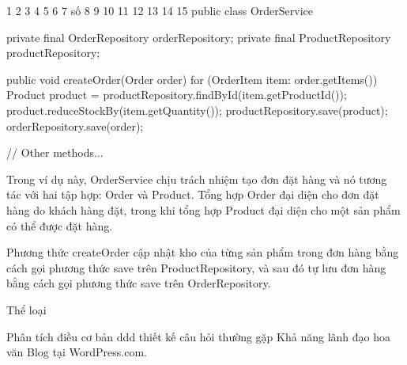 1
2
3
4
5
6
7
số 8
9
10
11
12
13
14
15
public class OrderService {
    private final OrderRepository orderRepository;
    private final ProductRepository productRepository;
 
    public void createOrder(Order order) {
        for (OrderItem item: order.getItems()) {
            Product product = productRepository.findById(item.getProductId());
            product.reduceStockBy(item.getQuantity());
            productRepository.save(product);
        }
        orderRepository.save(order);
    }
 
    // Other methods...
}
Trong ví dụ này, OrderService chịu trách nhiệm tạo đơn đặt hàng và nó tương tác với hai tập hợp: Order và Product. Tổng hợp Order đại diện cho đơn đặt hàng do khách hàng đặt, trong khi tổng hợp Product đại diện cho một sản phẩm có thể được đặt hàng.

Phương thức createOrder cập nhật kho của từng sản phẩm trong đơn hàng bằng cách gọi phương thức save trên ProductRepository, và sau đó tự lưu đơn hàng bằng cách gọi phương thức save trên OrderRepository.


Thể loại

Phân tích
điều cơ bản
ddd
thiết kế
câu hỏi thường gặp
Khả năng lãnh đạo
hoa văn
Blog tại WordPress.com.


